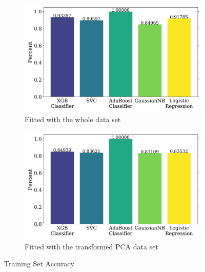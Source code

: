 \documentclass{article}
\begin{document}
\begin{figure}[H]
    \centering
    \begin{subfigure}[t]{0.495\textwidth}
        \centering
        \includegraphics[width=\textwidth]{supporting_images/train_acc_notpca.png}
        \caption{Fitted with the whole data set}
        \label{fig:train_acc_notpca}
    \end{subfigure}
    \hfill
    \begin{subfigure}[t]{0.495\textwidth}
        \centering
        \includegraphics[width=\textwidth]{supporting_images/train_acc_pca.png}
        \caption{Fitted with the transformed PCA data set}
        \label{fig:train_acc_pca}
    \end{subfigure}
    \caption{Training Set Accuracy}
    \label{fig:train_acc}
\end{figure}
\end{document}
